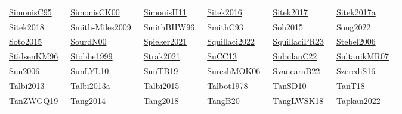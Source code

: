 \begin{longtable}{*{6}{l}}
\href{../works/SimonisC95.pdf}{SimonisC95}~\cite{SimonisC95} & \href{../works/SimonisCK00.pdf}{SimonisCK00}~\cite{SimonisCK00} & \href{../works/SimonisH11.pdf}{SimonisH11}~\cite{SimonisH11} & \href{../works/Sitek2016.pdf}{Sitek2016}~\cite{Sitek2016} & \href{../works/Sitek2017.pdf}{Sitek2017}~\cite{Sitek2017} & \href{../}{Sitek2017a}~\cite{Sitek2017a}\\ 
\href{../works/Sitek2018.pdf}{Sitek2018}~\cite{Sitek2018} & \href{../works/Smith-Miles2009.pdf}{Smith-Miles2009}~\cite{Smith-Miles2009} & \href{../works/SmithBHW96.pdf}{SmithBHW96}~\cite{SmithBHW96} & \href{../works/SmithC93.pdf}{SmithC93}~\cite{SmithC93} & \href{../works/Soh2015.pdf}{Soh2015}~\cite{Soh2015} & \href{../works/Song2022.pdf}{Song2022}~\cite{Song2022}\\ 
\href{../works/Soto2015.pdf}{Soto2015}~\cite{Soto2015} & \href{../works/SourdN00.pdf}{SourdN00}~\cite{SourdN00} & \href{../works/Spieker2021.pdf}{Spieker2021}~\cite{Spieker2021} & \href{../works/Squillaci2022.pdf}{Squillaci2022}~\cite{Squillaci2022} & \href{../works/SquillaciPR23.pdf}{SquillaciPR23}~\cite{SquillaciPR23} & \href{../}{Stebel2006}~\cite{Stebel2006}\\ 
\href{../}{StidsenKM96}~\cite{StidsenKM96} & \href{../works/Stobbe1999.pdf}{Stobbe1999}~\cite{Stobbe1999} & \href{../works/Strak2021.pdf}{Strak2021}~\cite{Strak2021} & \href{../works/SuCC13.pdf}{SuCC13}~\cite{SuCC13} & \href{../works/SubulanC22.pdf}{SubulanC22}~\cite{SubulanC22} & \href{../works/SultanikMR07.pdf}{SultanikMR07}~\cite{SultanikMR07}\\ 
\href{../works/Sun2006.pdf}{Sun2006}~\cite{Sun2006} & \href{../works/SunLYL10.pdf}{SunLYL10}~\cite{SunLYL10} & \href{../works/SunTB19.pdf}{SunTB19}~\cite{SunTB19} & \href{../works/SureshMOK06.pdf}{SureshMOK06}~\cite{SureshMOK06} & \href{../works/SvancaraB22.pdf}{SvancaraB22}~\cite{SvancaraB22} & \href{../works/SzerediS16.pdf}{SzerediS16}~\cite{SzerediS16}\\ 
\href{../works/Talbi2013.pdf}{Talbi2013}~\cite{Talbi2013} & \href{../}{Talbi2013a}~\cite{Talbi2013a} & \href{../works/Talbi2015.pdf}{Talbi2015}~\cite{Talbi2015} & \href{../}{Talbot1978}~\cite{Talbot1978} & \href{../works/TanSD10.pdf}{TanSD10}~\cite{TanSD10} & \href{../works/TanT18.pdf}{TanT18}~\cite{TanT18}\\ 
\href{../works/TanZWGQ19.pdf}{TanZWGQ19}~\cite{TanZWGQ19} & \href{../works/Tang2014.pdf}{Tang2014}~\cite{Tang2014} & \href{../works/Tang2018.pdf}{Tang2018}~\cite{Tang2018} & \href{../works/TangB20.pdf}{TangB20}~\cite{TangB20} & \href{../works/TangLWSK18.pdf}{TangLWSK18}~\cite{TangLWSK18} & \href{../}{Tapkan2022}~\cite{Tapkan2022}\\ 

\end{longtable}
